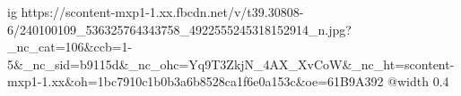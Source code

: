  
 
 
 
 

\ifcmt
  ig https://scontent-mxp1-1.xx.fbcdn.net/v/t39.30808-6/240100109_536325764343758_4922555245318152914_n.jpg?_nc_cat=106&ccb=1-5&_nc_sid=b9115d&_nc_ohc=Yq9T3ZkjN_4AX_XvCoW&_nc_ht=scontent-mxp1-1.xx&oh=1bc7910c1b0b3a6b8528ca1f6e0a153c&oe=61B9A392
  @width 0.4
\fi

